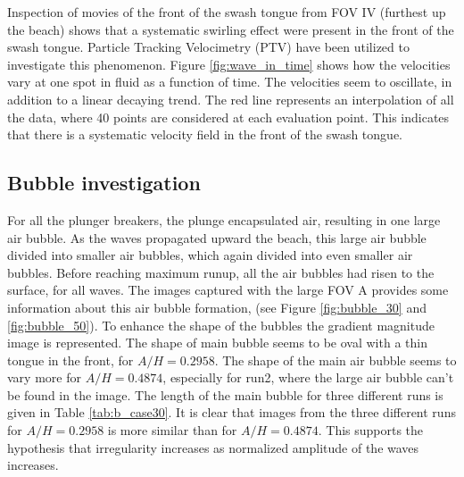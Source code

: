 \documentclass[a4paper, 11pt, english, twoside, openright]{article}
\begin{document}
Inspection of movies of the front of the swash tongue from FOV IV (furthest up the beach) shows that a systematic swirling effect were present in the front of the swash tongue.  Particle Tracking Velocimetry (PTV) have been utilized to investigate this phenomenon. Figure \ref{fig:wave_in_time} shows how the velocities vary at one spot in fluid as a function of time. The velocities seem to oscillate, in addition to a linear decaying trend. The red line represents an interpolation of all the data, where 40 points are considered at each evaluation point. This indicates that there is a systematic velocity field in the front of the swash tongue. 


 
 \subsection{Bubble investigation}
 \label{bub_inv}
 For all the plunger breakers, the plunge encapsulated air, resulting in one large air bubble. As the waves propagated upward the beach, this large air bubble divided into smaller air bubbles, which again divided into even smaller air bubbles. Before reaching maximum runup,  all the air bubbles had risen to the surface, for all waves. The images captured with the large FOV A provides some information about this air bubble formation, (see Figure \ref{fig:bubble_30} and \ref{fig:bubble_50}). To enhance the shape of the bubbles the gradient magnitude image is represented. The shape of main bubble seems to be oval with a thin tongue in the front, for $A/H=0.2958$. The shape of the main air bubble seems to vary more for $A/H=0.4874$, especially for run2, where the large air bubble can't be found in the image. The length of the main bubble for three different runs is given in Table \ref{tab:b_case30}. It is clear that images from the three different runs for $A/H=0.2958$ is more similar than for $A/H=0.4874$. This supports the hypothesis that irregularity increases as normalized amplitude of the waves increases.
\end{document}
